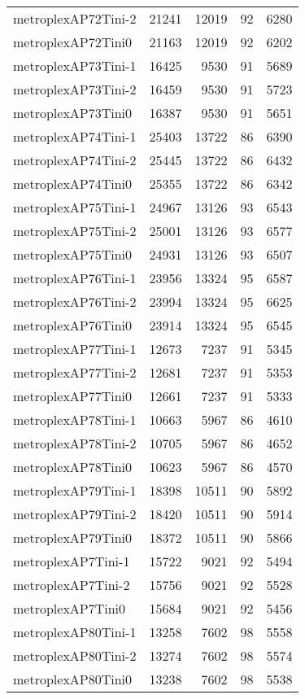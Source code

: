 \begin{longtable}{lrrrr}
metroplexAP72Tini-2 & 21241 & 12019 & 92 & 6280 \\
metroplexAP72Tini0 & 21163 & 12019 & 92 & 6202 \\
metroplexAP73Tini-1 & 16425 & 9530 & 91 & 5689 \\
metroplexAP73Tini-2 & 16459 & 9530 & 91 & 5723 \\
metroplexAP73Tini0 & 16387 & 9530 & 91 & 5651 \\
metroplexAP74Tini-1 & 25403 & 13722 & 86 & 6390 \\
metroplexAP74Tini-2 & 25445 & 13722 & 86 & 6432 \\
metroplexAP74Tini0 & 25355 & 13722 & 86 & 6342 \\
metroplexAP75Tini-1 & 24967 & 13126 & 93 & 6543 \\
metroplexAP75Tini-2 & 25001 & 13126 & 93 & 6577 \\
metroplexAP75Tini0 & 24931 & 13126 & 93 & 6507 \\
metroplexAP76Tini-1 & 23956 & 13324 & 95 & 6587 \\
metroplexAP76Tini-2 & 23994 & 13324 & 95 & 6625 \\
metroplexAP76Tini0 & 23914 & 13324 & 95 & 6545 \\
metroplexAP77Tini-1 & 12673 & 7237 & 91 & 5345 \\
metroplexAP77Tini-2 & 12681 & 7237 & 91 & 5353 \\
metroplexAP77Tini0 & 12661 & 7237 & 91 & 5333 \\
metroplexAP78Tini-1 & 10663 & 5967 & 86 & 4610 \\
metroplexAP78Tini-2 & 10705 & 5967 & 86 & 4652 \\
metroplexAP78Tini0 & 10623 & 5967 & 86 & 4570 \\
metroplexAP79Tini-1 & 18398 & 10511 & 90 & 5892 \\
metroplexAP79Tini-2 & 18420 & 10511 & 90 & 5914 \\
metroplexAP79Tini0 & 18372 & 10511 & 90 & 5866 \\
metroplexAP7Tini-1 & 15722 & 9021 & 92 & 5494 \\
metroplexAP7Tini-2 & 15756 & 9021 & 92 & 5528 \\
metroplexAP7Tini0 & 15684 & 9021 & 92 & 5456 \\
metroplexAP80Tini-1 & 13258 & 7602 & 98 & 5558 \\
metroplexAP80Tini-2 & 13274 & 7602 & 98 & 5574 \\
metroplexAP80Tini0 & 13238 & 7602 & 98 & 5538 \\

\end{longtable}
